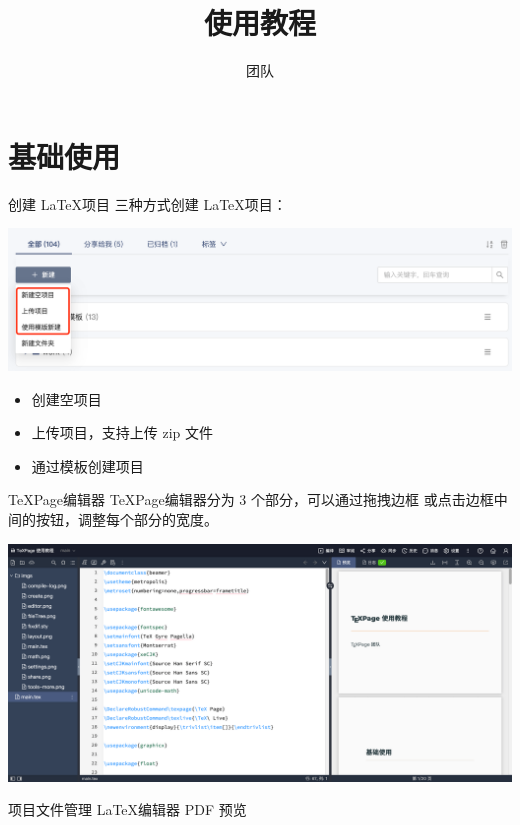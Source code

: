 \documentclass{beamer}
\title{\texpage 使用教程}
\author{\texpage 团队}
\date{}
\DeclareRobustCommand\texpage{\TeX Page}
\newenvironment{display}{\trivlist\item[]}{\endtrivlist}
\begin{document}
\maketitle

\section{基础使用}

\begin{frame}{创建 \LaTeX 项目}
三种方式创建 \LaTeX 项目：

\begin{display}
\includegraphics[width=\textwidth]{imgs/create.png}
\end{display}

\begin{itemize}
\item 创建空项目
\item 上传项目，支持上传 zip 文件
\item 通过模板创建项目
\end{itemize}
\end{frame}




\begin{frame}{\texpage 编辑器}
\texpage 编辑器分为 3 个部分，可以通过拖拽边框
或点击边框中间的按钮，调整每个部分的宽度。

\begin{display}
\includegraphics[width=\textwidth]{imgs/layout.png}
\end{display}


项目文件管理%
\LaTeX 编辑器%
PDF 预览

\end{frame}
\end{document}
